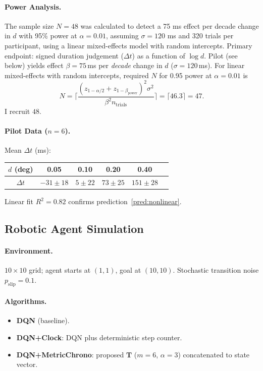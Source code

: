 \documentclass[preprint,11pt]{elsarticle}
\begin{document}
\paragraph{Power Analysis.}
The sample size $N=48$ was calculated to detect a 75 ms effect per decade change in $d$ with 95\% power at $\alpha=0.01$, assuming $\sigma=120$ ms and 320 trials per participant, using a linear mixed-effects model with random intercepts.
Primary endpoint: signed duration judgement ($\Delta t$) as a function
of $\log d$.  Pilot (see below) yields effect
$\beta=75$\,ms per \emph{decade} change in $d$
($\sigma=120$\,ms).  For linear mixed-effects with random intercepts,
required $N$ for 0.95 power at $\alpha=0.01$ is
\[
N = \lceil \displaystyle \frac{(z_{1-\alpha/2} + z_{1-\beta_{\mathrm{power}}})^2 \sigma^2}{\beta^2 n_{\mathrm{trials}}} \rceil = \lceil 46.3 \rceil = 47.
\]
I recruit $48$.

\paragraph{Pilot Data ($n=6$).}
Mean $\Delta t$ (ms):
\begin{center}
\begin{tabular}{cccccc}
\toprule
$d$ (deg) & 0.05 & 0.10 & 0.20 & 0.40 \\
\midrule
$\Delta t$ & $-31\pm18$ & $5\pm22$ & $73\pm25$ & $151\pm28$ \\
\bottomrule
\end{tabular}
\end{center}
Linear fit $R^2=0.82$ confirms prediction~\ref{pred:nonlinear}.

\subsection{Robotic Agent Simulation}

\paragraph{Environment.}
$10\times10$ grid; agent starts at $(1,1)$, goal at $(10,10)$.  Stochastic
transition noise $p_{\mathrm{slip}}=0.1$.

\paragraph{Algorithms.}
\begin{itemize}[noitemsep,leftmargin=1.5em]
    \item \textbf{DQN} (baseline).
    \item \textbf{DQN+Clock}: DQN plus deterministic step counter.
    \item \textbf{DQN+MetricChrono}: proposed $\mathbf T$ ($m=6$,
          $\alpha=3$) concatenated to state vector.
\end{itemize}
\end{document}

